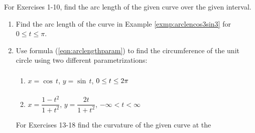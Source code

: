 {\small
{}
\par\noindent For Exercises 1-10, find the arc length of the given curve over
 the given interval.
\begin{enumerate}[\bfseries 1.]
 \item Find the arc length of the curve in Example \ref{exmp:arclencos3sin3} for
  $0 \le t \le \pi$.
 \item Use formula (\ref{eqn:arclengthparam}) to find the circumference of
  the unit circle using two different parametrizations:
\begin{multicols}{2}
\begin{enumerate}[\bfseries (a)]
 \item $x=\cos\,t$, $y=\sin\,t$, $0 \le t \le 2\pi\vphantom{\dfrac{1-t^2}{1+t^2}}$
 \item $x=\dfrac{1-t^2}{1+t^2}$, $y=\dfrac{2t}{1+t^2}$, $-\infty < t < \infty$
\end{enumerate}
\end{multicols}
\noindent For Exercises 13-18 find the curvature of the given curve at the

\end{enumerate}}
